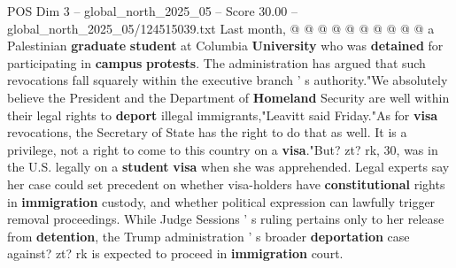 \begin{textsample}{POS Dim 3 – global\_north\_2025\_05 – Score 30.00 – global\_north\_2025\_05/124515039.txt}
Last month, @ @ @ @ @ @ @ @ @ @ a Palestinian \textbf{graduate} \textbf{student} at Columbia \textbf{University} who was \textbf{detained} for participating in \textbf{campus} \textbf{protests}.
The administration has argued that such revocations fall squarely within the executive branch ' s authority."We absolutely believe the President and the Department of \textbf{Homeland} Security are well within their legal rights to \textbf{deport} illegal immigrants,"Leavitt said Friday."As for \textbf{visa} revocations, the Secretary of State has the right to do that as well.
It is a privilege, not a right to come to this country on a \textbf{visa}."But? zt? rk, 30, was in the U.S. legally on a \textbf{student} \textbf{visa} when she was apprehended.
Legal experts say her case could set precedent on whether visa-holders have \textbf{constitutional} rights in \textbf{immigration} custody, and whether political expression can lawfully trigger removal proceedings.
While Judge Sessions ' s ruling pertains only to her release from \textbf{detention}, the Trump administration ' s broader \textbf{deportation} case against? zt? rk is expected to proceed in \textbf{immigration} court.

\end{textsample}
